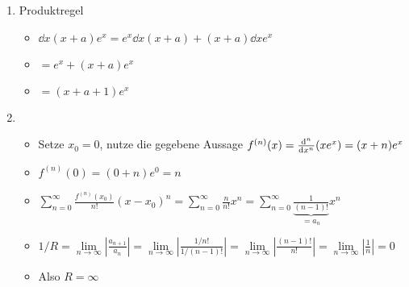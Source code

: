 \item
	\begin{enumerate}
	
	\item Produktregel
		\begin{itemize}
			\item $\dd{}{x} (x+a)e^x = e^x\dd{}{x}(x+a)+(x+a)\dd{}{x}e^x$
			\item $= e^x+(x+a)e^x$
			\item $= (x+a+1)e^x$
		\end{itemize}
	
	\item
		\begin{itemize}
			\item Setze $x_0=0$, nutze die gegebene Aussage $f^{(n)}(x) = \frac{\mathrm{d}^{n}{}}{\mathrm{d}{x^{n}}} (xe^x) = (x+n)e^x$
			\item $f^{(n)}(0) = (0+n)e^0 = n$
			\item $\sum\limits_{n=0}^{\infty} \frac{f^{(n)}(x_0)}{n!} (x-x_0)^n = \sum\limits_{n=0}^{\infty} \frac{n}{n!} x^n = \sum\limits_{n=0}^{\infty} \underbrace{\frac{1}{(n-1)!}}_{=a_n} x^n$
			\item $1/R = \lim\limits_{n\to\infty} \left|\frac{a_{n+1}}{a_n}\right| = \lim\limits_{n\to\infty} \left|\frac{1/n!}{1/(n-1)!}\right| =\lim\limits_{n\to\infty} \left|\frac{(n-1)!}{n!}\right| = \lim\limits_{n\to\infty} |\frac{1}{n}| = 0$
			\item Also $R=\infty$
		\end{itemize}
	\end{enumerate}
